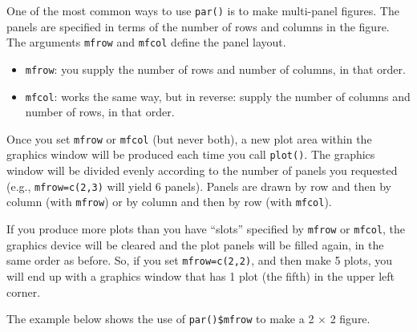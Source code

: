 \documentclass[
  13,
  letterpaper,
]{report}
\newenvironment{Shaded}{\begin{snugshade}}{\end{snugshade}}
\newcommand{\AttributeTok}[1]{\textcolor[rgb]{0.40,0.45,0.13}{#1}}
\newcommand{\CommentTok}[1]{\textcolor[rgb]{0.37,0.37,0.37}{#1}}
\newcommand{\DecValTok}[1]{\textcolor[rgb]{0.68,0.00,0.00}{#1}}
\newcommand{\FloatTok}[1]{\textcolor[rgb]{0.68,0.00,0.00}{#1}}
\newcommand{\FunctionTok}[1]{\textcolor[rgb]{0.28,0.35,0.67}{#1}}
\newcommand{\NormalTok}[1]{\textcolor[rgb]{0.00,0.23,0.31}{#1}}
\newcommand{\SpecialCharTok}[1]{\textcolor[rgb]{0.37,0.37,0.37}{#1}}
\newcommand{\StringTok}[1]{\textcolor[rgb]{0.13,0.47,0.30}{#1}}
\providecommand{\tightlist}{%
  \setlength{\itemsep}{0pt}\setlength{\parskip}{0pt}}
\begin{document}
One of the most common ways to use \texttt{par()} is to make multi-panel
figures. The panels are specified in terms of the number of rows and
columns in the figure. The arguments \texttt{mfrow} and \texttt{mfcol}
define the panel layout.

\begin{itemize}
\tightlist
\item
  \texttt{mfrow}: you supply the number of rows and number of columns,
  in that order.
\item
  \texttt{mfcol}: works the same way, but in reverse: supply the number
  of columns and number of rows, in that order.
\end{itemize}

Once you set \texttt{mfrow} or \texttt{mfcol} (but never both), a new
plot area within the graphics window will be produced each time you call
\texttt{plot()}. The graphics window will be divided evenly according to
the number of panels you requested (e.g., \texttt{mfrow=c(2,3)} will
yield 6 panels). Panels are drawn by row and then by column (with
\texttt{mfrow}) or by column and then by row (with \texttt{mfcol}).

If you produce more plots than you have ``slots'' specified by
\texttt{mfrow} or \texttt{mfcol}, the graphics device will be cleared
and the plot panels will be filled again, in the same order as before.
So, if you set \texttt{mfrow=c(2,2)}, and then make 5 plots, you will
end up with a graphics window that has 1 plot (the fifth) in the upper
left corner.

The example below shows the use of \texttt{par()\$mfrow} to make a 2
\(\times\) 2 figure.

\begin{Shaded}
\end{Shaded}
\end{document}
